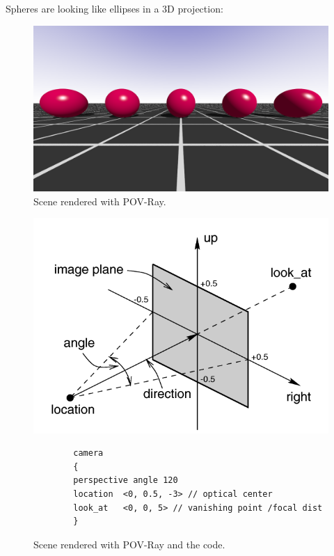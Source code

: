 \documentclass[a4paper,twocolumn]{article}
\begin{document}
	


	
	Spheres are looking like ellipses in a 3D projection:
	
	\begin{figure}[h]
		\centering
		\includegraphics[width=\columnwidth]{images/task_1c.png}
		\caption{Scene rendered with POV-Ray.}
		\label{fig:povray_scene}
	\end{figure}
	
	\begin{figure}[h]
		\centering
		\includegraphics[width=\columnwidth]{images/povray_camera.png}
		\begin{verbatim}
		camera
		{
		perspective angle 120
		location  <0, 0.5, -3> // optical center
		look_at   <0, 0, 5> // vanishing point /focal dist
		}
		\end{verbatim}
		\caption{Scene rendered with POV-Ray and the code.}
		\label{fig:povray_camera}
	\end{figure}
	
\end{document}
